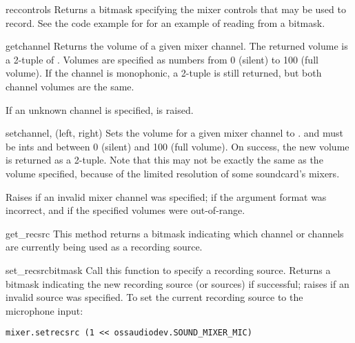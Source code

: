 \begin{methoddesc}{reccontrols}{}
Returns a bitmask specifying the mixer controls that may be used to
record.  See the code example for  for an example of
reading from a bitmask.
\end{methoddesc}

\begin{methoddesc}{get}{channel}
Returns the volume of a given mixer channel.  The returned volume is a
2-tuple of .  Volumes are specified as
numbers from 0 (silent) to 100 (full volume).  If the channel is
monophonic, a 2-tuple is still returned, but both channel volumes are
the same.

If an unknown channel is specified,  is raised.
\end{methoddesc}

\begin{methoddesc}{set}{channel, (left, right)}
Sets the volume for a given mixer channel to .
 and  must be ints and between 0 (silent) and 100
(full volume).  On success, the new volume is returned as a 2-tuple.
Note that this may not be exactly the same as the volume specified,
because of the limited resolution of some soundcard's mixers.

Raises  if an invalid mixer channel was specified;
 if the argument format was incorrect, and
 if the specified volumes were out-of-range.
\end{methoddesc}

\begin{methoddesc}{get_recsrc}{}
This method returns a bitmask indicating which channel or channels are
currently being used as a recording source.
\end{methoddesc}

\begin{methoddesc}{set_recsrc}{bitmask}
Call this function to specify a recording source.  Returns a bitmask
indicating the new recording source (or sources) if successful; raises
 if an invalid source was specified.  To set the current
recording source to the microphone input:

\begin{verbatim}
mixer.setrecsrc (1 << ossaudiodev.SOUND_MIXER_MIC)
\end{verbatim}
\end{methoddesc}



